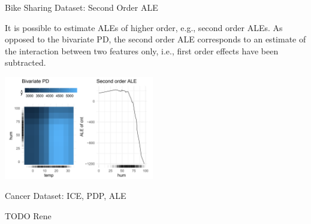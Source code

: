 \documentclass[aspectratio=169]{../latex_main/tntbeamer}  %
\begin{document}

\begin{frame}{Bike Sharing Dataset: Second Order ALE}

It is possible to estimate ALEs of higher order, e.g., second order ALEs. As opposed to the bivariate PD, the second order ALE corresponds to an estimate of the interaction between two features only, i.e., first order effects have been subtracted.

\vspace{0.1cm}

\begin{center}
\includegraphics[width=0.49\textwidth]{figure/second-order.png}
\end{center}

\end{frame}



\begin{frame}{Cancer Dataset: ICE, PDP, ALE}

TODO Rene

\end{frame}


	
\end{document}
